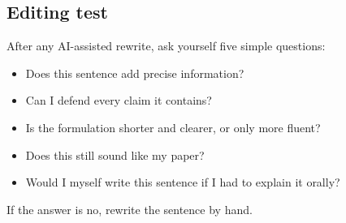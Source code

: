 \documentclass[11pt,a4paper]{article}
\theoremstyle{definition}
\begin{document}
\subsection*{Editing test}

After any AI-assisted rewrite, ask yourself five simple questions:
\begin{itemize}
    \item Does this sentence add precise information?
    \item Can I defend every claim it contains?
    \item Is the formulation shorter and clearer, or only more fluent?
    \item Does this still sound like my paper?
    \item Would I myself write this sentence if I had to explain it orally?
\end{itemize}

If the answer is no, rewrite the sentence by hand.
\end{document}
